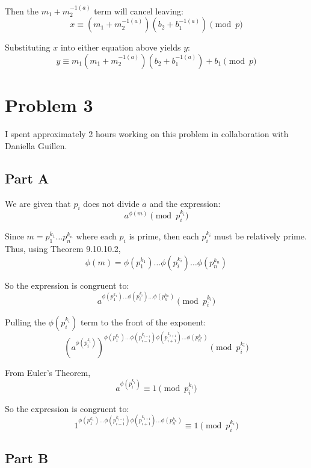 \documentclass{article}
\begin{document}
Then the $m_1 + m_2^{-1(a)}$ term will cancel leaving:
$$ x \equiv \left(m_1 + m_2^{-1(a)}\right) \left(b_2 + b_1^{-1(a)}\right)
\pmod{p} $$

Substituting $x$ into either equation above yields $y$:
$$ y \equiv m_1 \left(m_1 + m_2^{-1(a)}\right) \left(b_2 + b_1^{-1(a)}\right) +
b_1 \pmod{p} $$

\break

\section*{Problem 3}

I spent approximately 2 hours working on this problem in collaboration with
Daniella Guillen.

\subsection*{Part A}

We are given that $p_i$ does not divide $a$ and the expression:
$$ a^{\phi(m)} \pmod{p_i^{k_i}} $$

Since $m = p_1^{k_1} \ldots p_n^{k_n}$ where each $p_i$ is prime, then each
$p_i^{k_i}$ must be relatively prime. Thus, using Theorem 9.10.10.2,
$$ \phi(m) = \phi\left(p_1^{k_1}\right) \ldots \phi\left(p_i^{k_i}\right)
\ldots \phi\left(p_n^{k_n}\right) $$

So the expression is congruent to:
$$ a^{\phi\left(p_1^{k_1}\right) \ldots \phi\left(p_i^{k_i}\right) \ldots
\phi\left(p_n^{k_n}\right)} \pmod{p_i^{k_i}} $$

Pulling the $\phi\left(p_i^{k_i}\right)$ term to the front of the exponent:
$$ \left(a^{\phi\left(p_i^{k_i}\right)}
\right)^{\phi\left(p_1^{k_1}\right) \ldots \phi\left(p_{i-1}^{k_{i-1}}\right)
\phi\left(p_{i+1}^{k_{i+1}}\right)\ldots \phi\left(p_n^{k_n}\right)}
\pmod{p_i^{k_i}} $$

From Euler's Theorem,
$$ a^{\phi\left(p_i^{k_i}\right)} \equiv 1 \pmod{p_i^{k_i}} $$

So the expression is congruent to:
$$ 1^{\phi\left(p_1^{k_1}\right) \ldots \phi\left(p_{i-1}^{k_{i-1}}\right)
\phi\left(p_{i+1}^{k_{i+1}}\right)\ldots \phi\left(p_n^{k_n}\right)} \equiv 1
\pmod{p_i^{k_i}} $$

\break

\subsection*{Part B}
\end{document}

